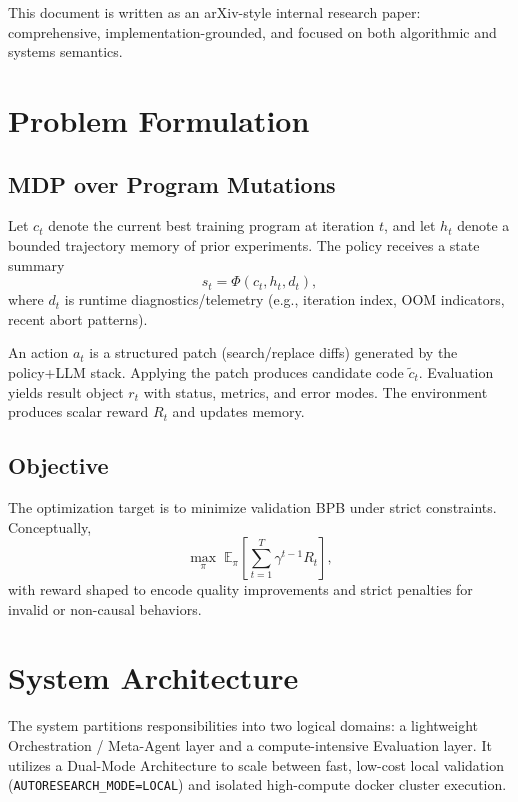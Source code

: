 \documentclass[11pt]{article}
\begin{document}
This document is written as an arXiv-style internal research paper: comprehensive, implementation-grounded, and focused on both algorithmic and systems semantics.

\section{Problem Formulation}
\subsection{MDP over Program Mutations}
Let $c_t$ denote the current best training program at iteration $t$, and let $h_t$ denote a bounded trajectory memory of prior experiments. The policy receives a state summary
\begin{equation}
    s_t = \Phi(c_t, h_t, d_t),
\end{equation}
where $d_t$ is runtime diagnostics/telemetry (e.g., iteration index, OOM indicators, recent abort patterns).

An action $a_t$ is a structured patch (search/replace diffs) generated by the policy+LLM stack. Applying the patch produces candidate code $\tilde{c}_t$. Evaluation yields result object $r_t$ with status, metrics, and error modes. The environment produces scalar reward $R_t$ and updates memory.

\subsection{Objective}
The optimization target is to minimize validation BPB under strict constraints. Conceptually,
\begin{equation}
\max_\pi \; \mathbb{E}_{\pi}\left[\sum_{t=1}^{T} \gamma^{t-1} R_t\right],
\end{equation}
with reward shaped to encode quality improvements and strict penalties for invalid or non-causal behaviors.

\section{System Architecture}

The system partitions responsibilities into two logical domains: a lightweight Orchestration / Meta-Agent layer and a compute-intensive Evaluation layer. It utilizes a Dual-Mode Architecture to scale between fast, low-cost local validation (\texttt{AUTORESEARCH\_MODE=LOCAL}) and isolated high-compute docker cluster execution.
\end{document}
